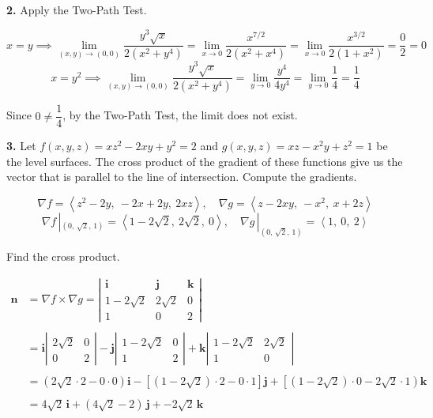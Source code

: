 \documentclass{article}
\begin{document}
\vspace{1em}

\textbf{2.} Apply the Two-Path Test.

\[x=y\implies\lim_{(x,y)\to(0,0)}\frac{y^3\sqrt x}{2\left(x^2+y^4\right)}=\lim_{x\to0}\frac{x^{7/2}}{2\left(x^2+x^4\right)}=\lim_{x\to0}\frac{x^{3/2}}{2\left(1+x^2\right)}=\frac02=0\]
\[x=y^2\implies\lim_{(x,y)\to(0,0)}\frac{y^3\sqrt x}{2\left(x^2+y^4\right)}=\lim_{y\to0}\frac{y^4}{4y^4}=\lim_{y\to0}\frac14=\frac14\]

Since $0\neq\dfrac14$, by the Two-Path Test, the limit does not exist.

\vspace{1em}

\textbf{3.} Let $f(x,y,z)=xz^2-2xy+y^2=2$ and $g(x,y,z)=xz-x^2y+z^2=1$ be the level surfaces. The cross product of the gradient of these functions give us the vector that is parallel to the line of intersection. Compute the gradients.

\[\nabla f=\left\langle z^2-2y,\:-2x+2y,\:2xz\right\rangle,\quad \nabla g=\left\langle z-2xy,\:-x^2,\: x+2z\right\rangle\]
\[\nabla f\,|_{\left(0,\,\sqrt2,\,1\right)}=\left\langle1-2\sqrt2,\:2\sqrt2,\:0\right\rangle,\quad \nabla g\,|_{\left(0,\,\sqrt2,\,1\right)}=\left\langle1,\:0,\:2\right\rangle\]

Find the cross product.

\begin{align*}\mathbf{n}&=\nabla f\times \nabla g=\left|\begin{array}{ccc}
\mathbf{i}&\mathbf{j}&\mathbf{k}\\
1-2\sqrt2&2\sqrt2&0\\
1&0&2
\end{array}\right|\\\\&=\mathbf{i}\left|\begin{array}{cc}
2\sqrt2&0\\0&2
\end{array}\right|-\mathbf{j}\left|\begin{array}{cc}
1-2\sqrt2&0\\1&2
\end{array}\right|+\mathbf{k}\left|\begin{array}{cc}
1-2\sqrt2&2\sqrt2\\1&0
\end{array}\right|\\\\&=\left(2\sqrt2\cdot2-0\cdot0\right)\mathbf{i}-\left[\left(1-2\sqrt2\right)\cdot2-0\cdot1\right]\mathbf{j}+\left[\left(1-2\sqrt2\right)\cdot0-2\sqrt2\cdot1\right)\mathbf{k}\\\\&=4\sqrt2\,\mathbf{i}+\left(4\sqrt2-2\right)\,\mathbf{j}+-2\sqrt2\,\mathbf{k}\end{align*}
\end{document}
